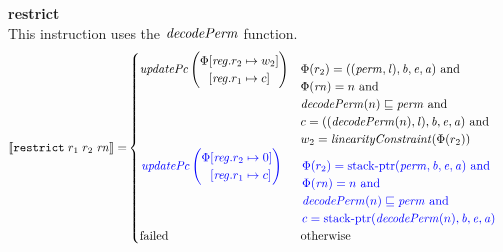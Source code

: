 \documentclass[a3paper]{article}
\newcommand{\sem}[1]{\left\llbracket #1 \right\rrbracket}
\newcommand{\tand}{\text{ and }}
\newcommand{\totherwise}{\text{otherwise }}
\newcommand{\sourcecolor}{\color{blue}}
\newcommand{\targetcolor}[1]{\color{black}}
\newcommand{\trg}[1]{{\targetcolor{} #1}}
\newcommand{\zinstr}[1]{\texttt{#1}}
\newcommand{\threeinstr}[4]{
  \ifthenelse{\equal{#2#3#4}{}}
  {\zinstr{#1}}
  {\zinstr{#1} \; #2 \; #3 \; #4}
}
\newcommand{\trestrict}[3]{\threeinstr{\trg{restrict}}{#1}{#2}{#3}}
\newcommand{\update}[2]{[#1 \mapsto #2]}
\newcommand{\updReg}[2]{\update{\reg.#1}{#2}}
\newcommand{\perm}{\var{perm}}
\newcommand{\lin}{\var{l}}
\newcommand{\stkptr}[1]{\mathrm{stack\text{-}ptr}(#1)}
\newcommand{\failed}{\mathrm{failed}}
\newcommand{\var}[1]{\mathit{#1}}
\newcommand{\rn}{\var{rn}}
\newcommand{\reg}{\var{reg}}
\newcommand{\baddr}{\var{b}}
\newcommand{\eaddr}{\var{e}}
\newcommand{\aaddr}{\var{a}}
\newcommand{\plainfun}[2]{
  \ifthenelse{\equal{#2}{}}
  {\mathit{#1}}
  {\mathit{#1}(#2)}
}
\newcommand{\decPerm}[1]{\plainfun{decodePerm}{#1}}
\newcommand{\linCons}[1]{\plainfun{linearityConstraint}{#1}}
\newcommand{\updPcAddr}[1]{\plainfun{updatePc}{#1}}
\begin{document}
\noindent\textbf{restrict}\\
This instruction uses the $\decPerm{}$ function.
\begin{align*}
  \sem{\trestrict{r_1}{r_2}{\rn}} = &
                                      \begin{cases}
                                        \updPcAddr{}\left(
                                          \arraycolsep=0pt
                                          \begin{array}{rl}
                                          \Phi&\updReg{r_2}{w_2}\\
                                              &\updReg{r_1}{c}
                                          \end{array} \right)
&
                                        \arraycolsep=0pt
                                        \begin{array}[t]{l}
                                          \Phi(r_2) = ((\perm,\lin),\baddr,\eaddr,\aaddr) \tand \\
                                          \Phi(\rn) = n \tand\\
                                          \decPerm{n} \sqsubseteq \perm \tand \\
                                          c = ((\decPerm{n},\lin),\baddr,\eaddr,\aaddr) \tand \\
                                          w_2 = \linCons{\Phi(r_2)}
                                        \end{array}
                                        \\
                                        \sourcecolor\left.
                                        \updPcAddr{}\left(
                                          \arraycolsep=0pt
                                          \begin{array}{rl}
                                          \Phi&\updReg{r_2}{0}\\
                                                    &\updReg{r_1}{c}
                                          \end{array}\right)\right.
                                        &
                                        \sourcecolor\left.
                                        \arraycolsep=0pt
                                        \begin{array}[t]{l}
                                          \Phi(r_2) = \stkptr{\perm,\baddr,\eaddr,\aaddr} \tand \\
                                          \Phi(\rn) = n \tand\\
                                          \decPerm{n} \sqsubseteq \perm \tand \\
                                          c = \stkptr{\decPerm{n},\baddr,\eaddr,\aaddr}
                                        \end{array}\right.
                                        \\
                                        \failed & \totherwise
                                      \end{cases}
\end{align*}
\end{document}
